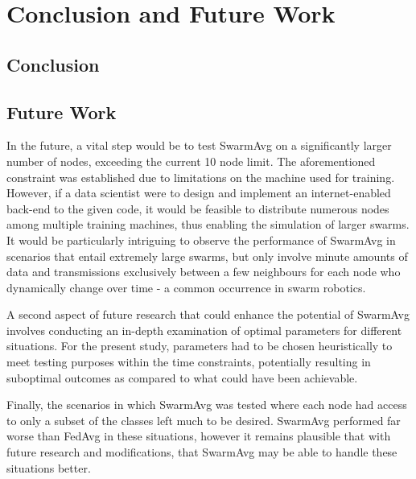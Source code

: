\chapter{Conclusion and Future Work}
\section{Conclusion}





\section{Future Work}
In the future, a vital step would be to test SwarmAvg on a significantly larger number of nodes, exceeding the current 10 node limit. The aforementioned constraint was established due to limitations on the machine used for training. However, if a data scientist were to design and implement an internet-enabled back-end to the given code, it would be feasible to distribute numerous nodes among multiple training machines, thus enabling the simulation of larger swarms. It would be particularly intriguing to observe the performance of SwarmAvg in scenarios that entail extremely large swarms, but only involve minute amounts of data and transmissions exclusively between a few neighbours for each node who dynamically change over time - a common occurrence in swarm robotics.

A second aspect of future research that could enhance the potential of SwarmAvg involves conducting an in-depth examination of optimal parameters for different situations. For the present study, parameters had to be chosen heuristically to meet testing purposes within the time constraints, potentially resulting in suboptimal outcomes as compared to what could have been achievable.

Finally, the scenarios in which SwarmAvg was tested where each node had access to only a subset of the classes left much to be desired. SwarmAvg performed far worse than FedAvg in these situations, however it remains plausible that with future research and modifications, that SwarmAvg may be able to handle these situations better.